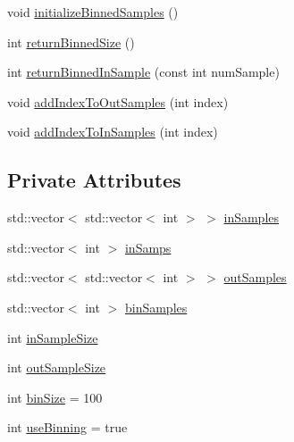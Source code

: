 \begin{DoxyCompactItemize}
void \hyperlink{classfp_1_1stratifiedInNodeClassIndices_ae9907f8984615f91417fb7961e1b582d}{initialize\+Binned\+Samples} ()
\item 
int \hyperlink{classfp_1_1stratifiedInNodeClassIndices_a9f77fe5e638170c4ad4ce99541561cfc}{return\+Binned\+Size} ()
\item 
int \hyperlink{classfp_1_1stratifiedInNodeClassIndices_a775d9a820b6f48ab44cd1ac4ffde1578}{return\+Binned\+In\+Sample} (const int num\+Sample)
\item 
void \hyperlink{classfp_1_1stratifiedInNodeClassIndices_adc99a046031545bc59c2b43abcf75ed9}{add\+Index\+To\+Out\+Samples} (int index)
\item 
void \hyperlink{classfp_1_1stratifiedInNodeClassIndices_a493b23961e38f5f534c236a22b4ff4b6}{add\+Index\+To\+In\+Samples} (int index)
\end{DoxyCompactItemize}
\subsection*{Private Attributes}
\begin{DoxyCompactItemize}
\item 
std\+::vector$<$ std\+::vector$<$ int $>$ $>$ \hyperlink{classfp_1_1stratifiedInNodeClassIndices_a6bfa636c77b48163f5d245959ea753d0}{in\+Samples}
\item 
std\+::vector$<$ int $>$ \hyperlink{classfp_1_1stratifiedInNodeClassIndices_ab6be4d82677c462494a4b4ef90c79bde}{in\+Samps}
\item 
std\+::vector$<$ std\+::vector$<$ int $>$ $>$ \hyperlink{classfp_1_1stratifiedInNodeClassIndices_aa569f727e65e0b4b0815e71c1ee819e8}{out\+Samples}
\item 
std\+::vector$<$ int $>$ \hyperlink{classfp_1_1stratifiedInNodeClassIndices_a399e239f3f3175e44ca409be96de0d32}{bin\+Samples}
\item 
int \hyperlink{classfp_1_1stratifiedInNodeClassIndices_a2acb617e3212806ae7f994d925bd1468}{in\+Sample\+Size}
\item 
int \hyperlink{classfp_1_1stratifiedInNodeClassIndices_aa947b545e6751902344e832fcc1c9641}{out\+Sample\+Size}
\item 
int \hyperlink{classfp_1_1stratifiedInNodeClassIndices_aeb008fe5e4d29845a675175590ef2de3}{bin\+Size} = 100
\item 
int \hyperlink{classfp_1_1stratifiedInNodeClassIndices_af6ca8b8a4539b8c35008cce88961fa00}{use\+Binning} = true
\end{DoxyCompactItemize}


